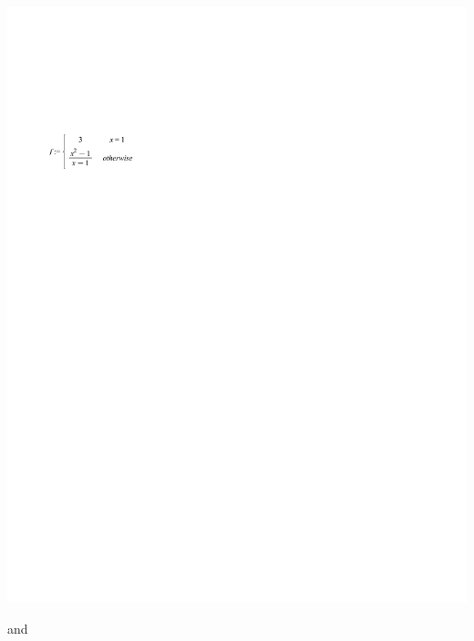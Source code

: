 \documentclass[nooutcomes]{ximera}
\begin{document}
\begin{problem}
\begin{enumerate}
\begin{freeResponse}
			 	\begin{image}
			 	\includegraphics[trim= 70 575 300 165]{Figure7.pdf}
			 	\end{image}
			 	
			and
			

\end{freeResponse}
\end{enumerate}
\end{problem}
\end{document}
